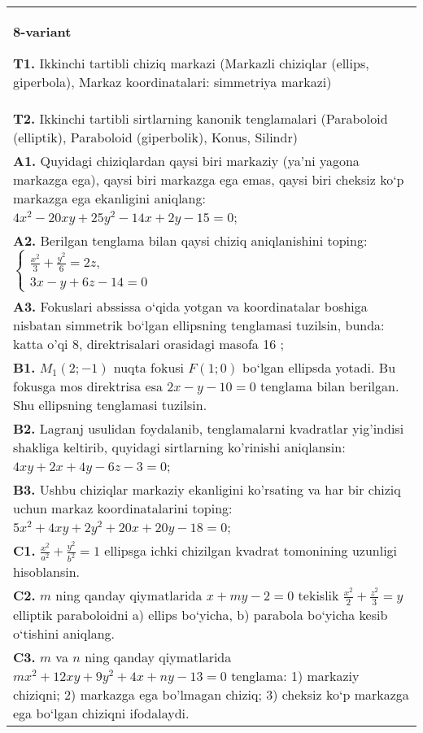 \documentclass{article}
\begin{document}
\begin{tabular}{m{17cm}}
\textbf{8-variant}
\newline

\textbf{T1.} Ikkinchi tartibli chiziq markazi (Markazli chiziqlar (ellips, giperbola), Markaz koordinatalari: simmetriya markazi) \\
\textbf{T2.} Ikkinchi tartibli sirtlarning kanonik tenglamalari (Paraboloid (elliptik), Paraboloid (giperbolik), Konus, Silindr) \\
\textbf{A1.} Quyidagi chiziqlardan qaysi biri markaziy (ya’ni yagona markazga ega), qaysi biri markazga ega emas, qaysi biri cheksiz ko‘p markazga ega ekanligini aniqlang: $4 x^2-20 x y+25 y^2-14 x+2 y-15=0$; \\
\textbf{A2.} Berilgan tenglama bilan qaysi chiziq aniqlanishini toping: $\left\{\begin{array}{l}\frac{x^2}{3}+\frac{y^2}{6}=2 z, \\ 3 x-y+6 z-14=0\end{array}\right.$ \\
\textbf{A3.} Fokuslari abssissa o‘qida yotgan va koordinatalar boshiga nisbatan simmetrik bo‘lgan ellipsning tenglamasi tuzilsin, bunda: katta o'qi 8, direktrisalari orasidagi masofa 16 ; \\
\textbf{B1.} $M_1 (2;-1)$ nuqta fokusi $F (1;0)$ bo‘lgan ellipsda yotadi. Bu fokusga mos direktrisa esa $2x-y-10=0$ tenglama bilan berilgan. Shu ellipsning tenglamasi tuzilsin. \\
\textbf{B2.} Lagranj usulidan foydalanib, tenglamalarni kvadratlar yig'indisi shakliga keltirib, quyidagi sirtlarning ko'rinishi aniqlansin: $4 x y+2 x+4 y-6 z-3=0$; \\
\textbf{B3.} Ushbu chiziqlar markaziy ekanligini ko'rsating va har bir chiziq uchun markaz koordinatalarini toping: $5 x^2+4 x y+2 y^2+20 x+20 y-18=0$; \\
\textbf{C1.} $\frac{x^2}{a^2}+\frac{y^2}{b^2}=1$ ellipsga ichki chizilgan kvadrat tomonining uzunligi hisoblansin. \\
\textbf{C2.} $m$ ning qanday qiymatlarida $x+m y-2=0$ tekislik $\frac{x^2}{2}+\frac{z^2}{3}=y$ elliptik paraboloidni a) ellips bo‘yicha, b) parabola bo‘yicha kesib o‘tishini aniqlang. \\
\textbf{C3.} $m$ va $n$ ning qanday qiymatlarida $m x^2+12 x y+9 y^2+4 x+n y-13=0$ tenglama: 1) markaziy chiziqni; 2) markazga ega bo'lmagan chiziq; 3) cheksiz ko‘p markazga ega bo‘lgan chiziqni ifodalaydi. \\

\end{tabular}
\vspace{1cm}
\end{document}
